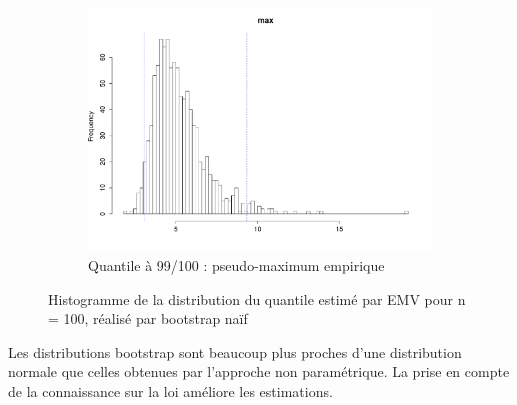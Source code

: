 \documentclass{article}
\renewcommand*{\(}{ \left( }
\renewcommand*{\)}{ \right) }
\begin{document}
\begin{figure}[H]
\begin{subfigure}[t]{0.3\textwidth}
        \includegraphics[width = \linewidth]{img/BootstrapAEMV-Max-100.pdf}
        \caption{Quantile à 99/100 : pseudo-maximum empirique}
        \label{fig:BAEMVMaxb}
    \end{subfigure}%
    \caption{Histogramme de la distribution du quantile estimé par EMV pour n = 100, réalisé par bootstrap naïf}
    \label{fig:BAEMVb}
\end{figure}


Les distributions bootstrap sont beaucoup plus proches d'une distribution normale que celles obtenues par l'approche non paramétrique. La prise en compte de la connaissance sur la loi améliore les estimations.
\end{document}
